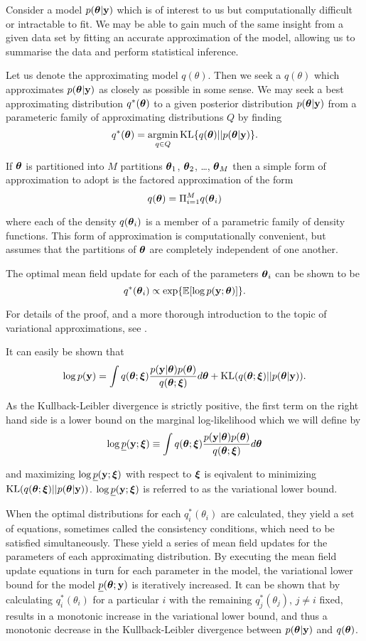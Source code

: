 Consider a model $p({\boldsymbol \theta}|{\bf y})$ which is of interest to us but computationally difficult or intractable to 
fit. We may be able to gain much of the same insight from a given data set by fitting an accurate approximation 
of the model, allowing us to summarise the data and perform statistical inference.

Let us denote the approximating model $q(\theta)$. Then we seek a $q(\theta)$ which approximates
$p({\boldsymbol \theta}|{\bf y})$ as closely as possible in some sense. 
We may seek a best approximating distribution $q^*({\boldsymbol \theta})$ to a given posterior distribution
$p({\boldsymbol \theta}|{\bf y})$ from a parameteric family of approximating distributions $Q$ by finding
\[
	q^*(\vtheta) = \argmin_{q \in Q} \KL \{ {q(\vtheta) || p(\vtheta|\vy)} \}.
\]

If ${\boldsymbol \theta}$ is partitioned into $M$ partitions ${\boldsymbol \theta}_1$, ${\boldsymbol \theta}_2$, \ldots, ${\boldsymbol \theta}_M$ then a 
simple form of approximation to adopt is the factored approximation of the form
\[
	q({\boldsymbol \theta}) = \Pi_{i=1}^M q({\boldsymbol \theta}_i)
\]

where each of the density $q({\boldsymbol \theta}_i)$ is a member of a parametric family of density functions. This form of
approximation is computationally convenient, but assumes that the partitions of ${\boldsymbol \theta}$ are completely
independent of one another.

The optimal mean field update for each of the parameters ${\boldsymbol \theta}_i$ can be shown to be
\[
	q^*({\boldsymbol \theta}_i) \propto \exp \{ \mathbb{E} [\log p({\bf y}; {\boldsymbol \theta})] \}.
\]

For details of the proof, and a more thorough introduction to the topic of variational approximations, see
\cite{Ormerod2010}.

\noindent It can easily be shown that
\[
	\displaystyle \log p({\bf y}) = \int q({\boldsymbol \theta};{\boldsymbol \xi})\frac{p({\bf y}|{\boldsymbol \theta})p({\boldsymbol \theta})}{q({\boldsymbol \theta};{\boldsymbol \xi})} d{\boldsymbol \theta} + \text{KL}(q({\boldsymbol \theta};{\boldsymbol \xi})||p({\boldsymbol \theta}|{\bf y})).
\]

\noindent As the Kullback-Leibler divergence is strictly positive, the first term on the right hand side
is a lower bound on the marginal log-likelihood which we will define by
$$
\displaystyle \log \underline{p}({\bf y};{\boldsymbol \xi}) \equiv \int q({\boldsymbol \theta};{\boldsymbol \xi})\frac{p({\bf y}|{\boldsymbol \theta})p({\boldsymbol \theta})}{q({\boldsymbol \theta};{\boldsymbol \xi})} d{\boldsymbol \theta}
$$

\noindent and maximizing $\log \underline{p}({\bf y};{\boldsymbol \xi})$ with respect to ${\boldsymbol \xi}$ is eqivalent to minimizing
$\text{KL}(q({\boldsymbol \theta};{\boldsymbol \xi})||p({\boldsymbol \theta}|{\bf y}))$. $\log \underline{p}({\bf y};{\boldsymbol \xi})$ is referred to as the
variational lower bound.

\noindent When the optimal distributions for each $q_i^*(\theta_i)$ are calculated, they yield a set of
equations, sometimes called the consistency conditions, which need to be  satisfied simultaneously. These
yield a series of mean field updates for the parameters of each approximating distribution. By executing the
mean field update equations in turn for each parameter in the model, the variational lower bound for the model
$\underline{p}({\boldsymbol \theta}; {\bf y})$ is iteratively increased. It can be shown that by calculating $q_i^*(\theta_i)$ for 
a particular $i$ with the remaining $q_j^*(\theta_j)$, $j\ne i$ fixed, results in a monotonic increase in the
variational lower bound, and thus a monotonic decrease in the Kullback-Leibler divergence between
$p({\boldsymbol \theta}|{\bf y})$ and $q({\boldsymbol \theta})$.

